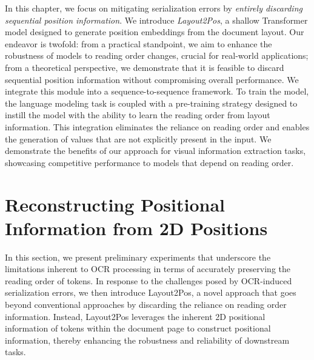 In this chapter, we focus on mitigating serialization errors by \textit{entirely discarding sequential position information}. We introduce \textit{Layout2Pos}, a shallow Transformer model designed to generate position embeddings from the document layout. Our endeavor is twofold: from a practical standpoint, we aim to enhance the robustness of models to reading order changes, crucial for real-world applications; from a theoretical perspective, we demonstrate that it is feasible to discard sequential position information without compromising overall performance. We integrate this module into a sequence-to-sequence framework. To train the model, the language modeling task is coupled with a pre-training strategy designed to instill the model with the ability to learn the reading order from layout information. This integration eliminates the reliance on reading order and enables the generation of values that are not explicitly present in the input. We demonstrate the benefits of our approach for visual information extraction tasks, showcasing competitive performance to models that depend on reading order.


\section{Reconstructing Positional Information from 2D Positions}

In this section, we present preliminary experiments that underscore the limitations inherent to \ac{OCR} processing in terms of accurately preserving the reading order of tokens. In response to the challenges posed by \ac{OCR}-induced serialization errors, we then introduce Layout2Pos, a novel approach that goes beyond conventional approaches by discarding the reliance on reading order information. Instead, Layout2Pos leverages the inherent 2D positional information of tokens within the document page to construct positional information, thereby enhancing the robustness and reliability of downstream tasks.

